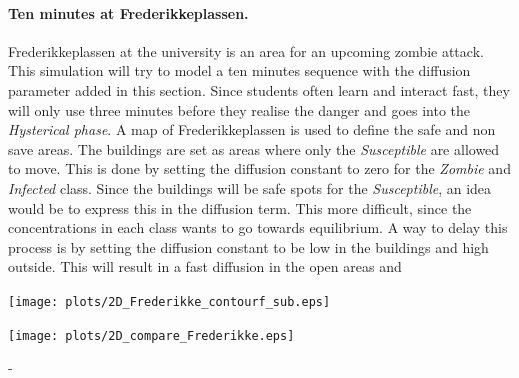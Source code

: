 \documentclass[%
twoside,                 %
final,                   %
10pt]{article}
\begin{document}
\paragraph{Ten minutes at Frederikkeplassen.}
Frederikkeplassen at the university is an area for an upcoming zombie attack. This simulation will try to model a ten minutes sequence with the diffusion parameter added in this section. Since students often learn and interact fast, they will only use three minutes before they realise the danger and goes into the \emph{Hysterical phase}. A map of Frederikkeplassen is used to define the safe and non save areas. The buildings are set as areas where only the \emph{Susceptible} are allowed to move. This is done by setting the diffusion constant to zero for the \emph{Zombie} and \emph{Infected} class. Since the buildings will be safe spots for the \emph{Susceptible}, an idea would be to express this in the diffusion term. This more difficult, since the concentrations in each class wants to go towards equilibrium. A way to delay this process is by setting the diffusion constant to be low in the buildings and high outside. This will result in a fast diffusion in the open areas and 



\begin{center}  %
  \centerline{\texttt{[image: plots/2D\_Frederikke\_contourf\_sub.eps]}}
\end{center}



\begin{center}  %
  \centerline{\texttt{[image: plots/2D\_compare\_Frederikke.eps]}}
\end{center}





-
\end{document}
